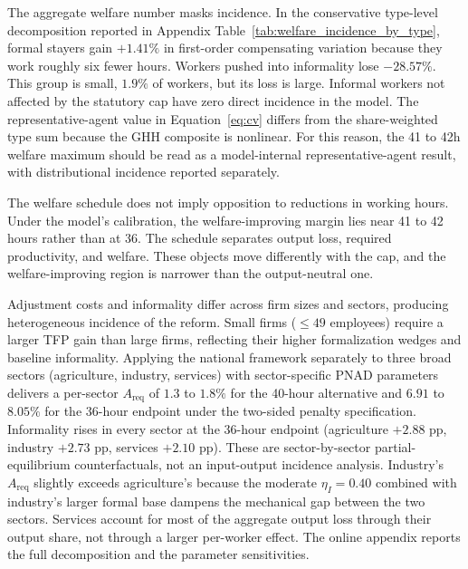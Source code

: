 The aggregate welfare number masks incidence. In the conservative type-level decomposition reported in Appendix Table~\ref{tab:welfare_incidence_by_type}, formal stayers gain $+1.41\%$ in first-order compensating variation because they work roughly six fewer hours. Workers pushed into informality lose $-28.57\%$. This group is small, $1.9\%$ of workers, but its loss is large. Informal workers not affected by the statutory cap have zero direct incidence in the model. The representative-agent value in Equation~\eqref{eq:cv} differs from the share-weighted type sum because the GHH composite is nonlinear. For this reason, the 41 to 42h welfare maximum should be read as a model-internal representative-agent result, with distributional incidence reported separately.

The welfare schedule does not imply opposition to reductions in working hours. Under the model's calibration, the welfare-improving margin lies near 41 to 42 hours rather than at 36. The schedule separates output loss, required productivity, and welfare. These objects move differently with the cap, and the welfare-improving region is narrower than the output-neutral one.

Adjustment costs and informality differ across firm sizes and sectors, producing heterogeneous incidence of the reform. Small firms ($\leq 49$ employees) require a larger TFP gain than large firms, reflecting their higher formalization wedges and baseline informality. Applying the national framework separately to three broad sectors (agriculture, industry, services) with sector-specific PNAD parameters delivers a per-sector $A_{\text{req}}$ of $1.3$ to $1.8\%$ for the 40-hour alternative and $6.91$ to $8.05\%$ for the 36-hour endpoint under the two-sided penalty specification. Informality rises in every sector at the 36-hour endpoint (agriculture $+2.88$ pp, industry $+2.73$ pp, services $+2.10$ pp). These are sector-by-sector partial-equilibrium counterfactuals, not an input-output incidence analysis. Industry's $A_{\text{req}}$ slightly exceeds agriculture's because the moderate $\eta_I=0.40$ combined with industry's larger formal base dampens the mechanical gap between the two sectors. Services account for most of the aggregate output loss through their output share, not through a larger per-worker effect. The online appendix reports the full decomposition and the parameter sensitivities.
